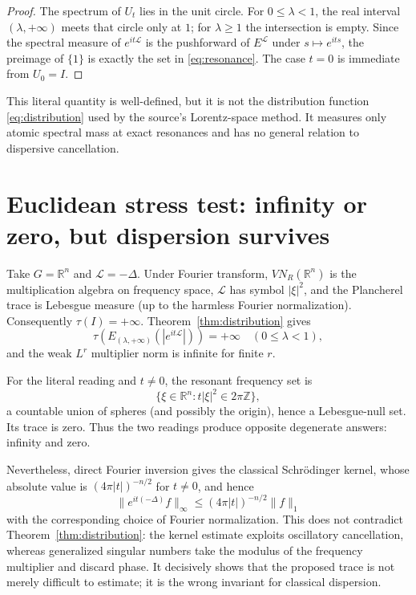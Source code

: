 \documentclass[11pt]{article}
\newcommand{\Lcal}{\mathcal L}
\begin{document}
\begin{proof}
The spectrum of $U_t$ lies in the unit circle.  For $0\le\lambda<1$, the real
interval $(\lambda,+\infty)$ meets that circle only at $1$; for
$\lambda\ge1$ the intersection is empty.  Since the spectral measure of
$e^{it\Lcal}$ is the pushforward of $E^{\Lcal}$ under $s\mapsto e^{its}$,
the preimage of $\{1\}$ is exactly the set in \eqref{eq:resonance}.  The case
$t=0$ is immediate from $U_0=I$.
\end{proof}

This literal quantity is well-defined, but it is not the distribution
function \eqref{eq:distribution} used by the source's Lorentz-space method.
It measures only atomic spectral mass at exact resonances and has no general
relation to dispersive cancellation.

\section{Euclidean stress test: infinity or zero, but dispersion survives}

Take $G=\mathbb R^n$ and $\Lcal=-\Delta$.  Under Fourier transform,
$VN_R(\mathbb R^n)$ is the multiplication algebra on frequency space,
$\Lcal$ has symbol $|\xi|^2$, and the Plancherel trace is Lebesgue measure
(up to the harmless Fourier normalization).  Consequently $\tau(I)=+\infty$.
Theorem~\ref{thm:distribution} gives
\[
 \tau\!\left(E_{(\lambda,+\infty)}(|e^{it\Lcal}|)\right)=+\infty
 \quad(0\le\lambda<1),
\]
and the weak $L^r$ multiplier norm is infinite for finite $r$.

For the literal reading and $t\ne0$, the resonant frequency set is
\[
 \{\xi\in\mathbb R^n:t|\xi|^2\in2\pi\mathbb Z\},
\]
a countable union of spheres (and possibly the origin), hence a Lebesgue-null
set.  Its trace is zero.  Thus the two readings produce opposite degenerate
answers: infinity and zero.

Nevertheless, direct Fourier inversion gives the classical Schr\"odinger
kernel, whose absolute value is $(4\pi|t|)^{-n/2}$ for $t\ne0$, and hence
\[
 \|e^{it(-\Delta)}f\|_\infty
 \le (4\pi|t|)^{-n/2}\|f\|_1
\]
with the corresponding choice of Fourier normalization.  This does not
contradict Theorem~\ref{thm:distribution}: the kernel estimate exploits
oscillatory cancellation, whereas generalized singular numbers take the
modulus of the frequency multiplier and discard phase.  It decisively shows
that the proposed trace is not merely difficult to estimate; it is the wrong
invariant for classical dispersion.
\end{document}
